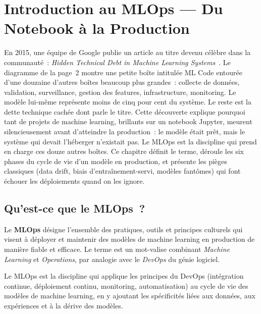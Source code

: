 \chapter{Introduction au MLOps --- Du Notebook \`a la Production}
\label{ch:introduction}

En 2015, une \'equipe de Google publie un article au titre devenu c\'el\`ebre dans la communaut\'e~: \emph{Hidden Technical Debt in Machine Learning Systems}~\cite{sculley2015}. Le diagramme de la page~2 montre une petite bo\^ite intitul\'ee \og{}ML Code\fg{} entour\'ee d'une douzaine d'autres bo\^ites beaucoup plus grandes~: collecte de donn\'ees, validation, surveillance, gestion des features, infrastructure, monitoring. Le mod\`ele lui-m\^eme repr\'esente moins de cinq pour cent du syst\`eme. Le reste est la dette technique cach\'ee dont parle le titre. Cette d\'ecouverte explique pourquoi tant de projets de machine learning, brillants sur un notebook Jupyter, meurent silencieusement avant d'atteindre la production~: le mod\`ele \'etait pr\^et, mais le syst\`eme qui devait l'h\'eberger n'existait pas. Le MLOps est la discipline qui prend en charge ces douze autres bo\^ites. Ce chapitre d\'efinit le terme, d\'eroule les six phases du cycle de vie d'un mod\`ele en production, et pr\'esente les pi\`eges classiques (data drift, biais d'entra\^inement-servi, mod\`eles fant\^omes) qui font \'echouer les d\'eploiements quand on les ignore.

\section{Qu'est-ce que le MLOps~?}
\label{sec:mlops-definition}

Le \textbf{MLOps} d\'esigne l'ensemble des pratiques, outils et
principes culturels qui visent \`a d\'eployer et maintenir des mod\`eles de
machine learning en production de mani\`ere fiable et efficace. Le terme est
un mot-valise combinant \emph{Machine Learning} et \emph{Operations}, par
analogie avec le \emph{DevOps} du g\'enie logiciel.

\begin{definition}[MLOps]
Le MLOps est la discipline qui applique les principes du DevOps (int\'egration
continue, d\'eploiement continu, monitoring, automatisation) au cycle de vie
des mod\`eles de machine learning, en y ajoutant les sp\'ecificit\'es li\'ees
aux donn\'ees, aux exp\'eriences et \`a la d\'erive des mod\`eles.
\end{definition}

